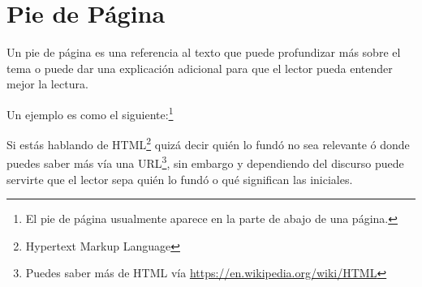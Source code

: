 \section{Pie de Página}

Un pie de página es una referencia al texto que puede profundizar más sobre el tema o puede dar una explicación adicional para que el lector
pueda entender mejor la lectura.

Un ejemplo es como el siguiente:\footnote{El pie de página usualmente aparece en la parte de abajo de una página.}

Si estás hablando de HTML\footnote{Hypertext Markup Language} quizá decir quién lo fundó no sea relevante ó donde puedes saber más vía una URL\footnote{Puedes saber más de HTML vía \url{https://en.wikipedia.org/wiki/HTML}}, sin embargo y dependiendo del discurso puede servirte que el lector sepa quién lo fundó
o qué significan las iniciales.
